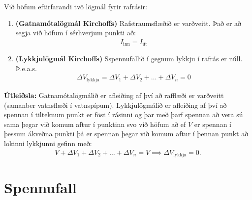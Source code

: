 \begin{tcolorbox}
\begin{theorem}
Við höfum eftirfarandi tvö lögmál fyrir rafrásir:
\begin{enumerate}[label = \textbf{(\roman*)}]
    \item \textbf{(Gatnamótalögmál Kirchoffs)} Rafstraumsflæðið er varðveitt. Það er að segja við höfum í sérhverjum punkti að:
    \begin{align*}
        I_{\text{inn}} = I_{\text{út}}
    \end{align*}
    \item \textbf{(Lykkjulögmál Kirchoffs)} Sspennufallið í gegnum lykkju í rafrás er núll. Þ.e.a.s.~
    \begin{align*}
       \Delta V_{\text{lykkja}} = \Delta V_1 + \Delta V_2 + \ldots + \Delta V_n = 0
    \end{align*}
\end{enumerate}
\end{theorem}
\begin{figure}[H]
    \centering
\end{figure}
\end{tcolorbox}

\textbf{Útleiðsla:} Gatnamótalögmálið er afleiðing af því að rafflæði er varðveitt (samanber vatnsflæði í vatnspípum). Lykkjulögmálið er afleiðing af því að spennan í tilteknum punkt er föst í rásinni og þar með þarf spennan að vera sú sama þegar við komum aftur í punktinn svo við höfum að ef $V$ er spennan í þessum ákveðna punkti þá er spennan þegar við komum aftur í þennan punkt að lokinni lykkjunni gefinn með:
\begin{align*}
    V + \Delta V_1 + \Delta V_2 + \ldots + \Delta V_n = V \implies \Delta V_{\text{lykkja}} = 0.
\end{align*}

\section{Spennufall}

